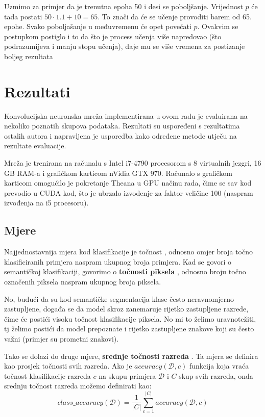 \documentclass[times, utf8, diplomski, numeric]{fer}
\newcommand{\abs}[1]{\left\lvert#1\right\rvert}
\begin{document}
Uzmimo za primjer da je trenutna epoha 50 i desi se poboljšanje. Vrijednost $p$ će tada postati $50 \cdot 1.1 + 10 = 65$. To znači da će se učenje provoditi barem od 65. epohe. Svako poboljašanje u međuvremenu će opet povećati $p$. Ovakvim se postupkom postiglo i to da što je process učenja više napredovao (što podrazumijeva i manju stopu učenja), daje mu se više vremena za postizanje boljeg rezultata


\chapter{Rezultati}

Konvolucijska neuronska mreža implementirana u ovom radu je evaluirana na nekoliko poznatih skupova podataka. Rezultati su uspoređeni s rezultatima ostalih autora i napravljena je usporedba kako određene metode utječu na rezultate evaluacije.

Mreža je trenirana na računalu s Intel i7-4790 procesorom s 8 virtualnih jezgri, 16 GB RAM-a i grafičkom karticom nVidia GTX 970. Računalo s grafičkom karticom omogućilo je pokretanje Theana u GPU načinu rada, čime se sav kod prevodio u CUDA kod, što je ubrzalo izvođenje za faktor veličine 100 (naspram izvođenja na i5 procesoru).

\section{Mjere}

Najjednostavnija mjera kod klasifikacije je točnost , odnosno omjer broja točno klasificiranih primjera naspram ukupnog broja primjera. Kad se govori o semantičkoj klasifikaciji, govorimo o \textbf{točnosti piksela} , odnosno broju točno označenih piksela naspram ukupnog broja piksela.

No, budući da su kod semantičke segmentacija klase često neravnomjerno zastupljene, događa se da model skroz zanemaruje rijetko zastupljene razrede, čime će postići visoku točnost klasifikacije piksela. No mi to želimo uravnotežiti, tj želimo postići da model prepoznate i rijetko zastupljene znakove koji su često važni (primjer su prometni znakovi).

Tako se dolazi do druge mjere, \textbf{srednje točnosti razreda} . Ta mjera se definira kao prosjek točnosti svih razreda. Ako je $accuracy(\mathcal{D}, c)$ funkcija koja vraća točnost klasifikacije razreda $c$ na skupu primjera $\mathcal{D}$ i $C$ skup svih razreda, onda srednju točnost razreda možemo definirati kao:
\begin{equation}
  class\_accuracy \left( \mathcal{D} \right) = \frac{1}{\abs{C}} \sum_{c=1}^{\abs{C}} accuracy(\mathcal{D}, c)
\end{equation}
\end{document}
